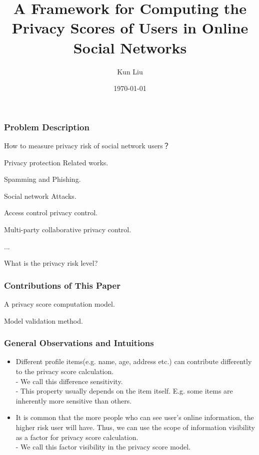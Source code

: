 \documentclass{beamer}
\title[Online Social Network Privacy]{A Framework for Computing the
  Privacy Scores of Users in Online Social Networks}
\author{Kun Liu}
\date{\today}
\begin{document}
\begin{frame}
  \titlepage
\end{frame}

\begin{frame}
  \frametitle{Problem Description}
  \begin{block}
    {How to measure privacy risk of social network users？}
    \begin{itemize}
      \LARGE{
    \item Privacy protection Related works. 
      \begin{itemize}
        \Large{
      \item Spamming and Phishing.
      \item Social network Attacks. 
      \item Access control privacy control.
      \item Multi-party collaborative privacy control. 
      \item ...}
      \end{itemize}
    \item What is the privacy risk level? }
    \end{itemize}
  \end{block}
\end{frame}

\begin{frame}
  \frametitle{Contributions of This Paper}
    \begin{itemize} 
      \LARGE{
      \item A privacy score computation model. 
      \item Model validation method. }
    \end{itemize}
\end{frame}

\begin{frame}%
  \frametitle{General Observations and Intuitions}
  \begin{itemize}
    \item Different profile items(e.g. name, age, address etc.) can
      contribute differently to the privacy score calculation. \\
      - We call this difference sensitivity. \\
      - This property usually depends on the item itself. E.g. some
      items are inherently more sensitive than others. 
    \item It is common that the more people who can see user's online
      information, the higher risk user will have. Thus, we can use
      the scope of information visibility as a factor for privacy
      score calculation. \\
      - We call this factor visibility in the privacy score model. 
  \end{itemize}
\end{frame}
\end{document}
